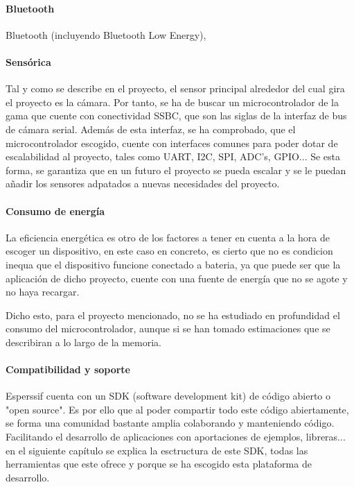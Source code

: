 \paragraph{Bluetooth}
Bluetooth (incluyendo Bluetooth Low Energy),

\paragraph{Sensórica}
Tal y como se describe en el proyecto, el sensor principal alrededor del cual gira el proyecto es la cámara. Por tanto, se ha de buscar un microcontrolador de la gama que cuente con conectividad SSBC, que son las siglas de la interfaz de bus de cámara serial. Además de esta interfaz, se ha comprobado, que el microcontrolador escogido, cuente con interfaces comunes para poder dotar de escalabilidad al proyecto, tales como UART, I2C, SPI, ADC's, GPIO... Se esta forma, se garantiza que en un futuro el proyecto se pueda escalar y se le puedan añadir los sensores adpatados a nuevas necesidades del proyecto. 

\paragraph{Consumo de energía}
La eficiencia energética es otro de los factores a tener en cuenta a la hora de escoger un dispositivo, en este caso en concreto, es cierto que no es condicion inequa que el dispositivo funcione conectado a bateria, ya que puede ser que la aplicación de dicho proyecto, cuente con una fuente de energía que no se agote y no haya recargar.

Dicho esto, para el proyecto mencionado, no se ha estudiado en profundidad el consumo del microcontrolador, aunque si se han tomado estimaciones que se describiran a lo largo de la memoria.

\paragraph{Compatibilidad y soporte}
Esperssif cuenta con un SDK (software development kit) de código abierto o "open source". Es por ello que al poder compartir todo este código abiertamente, se forma una comunidad bastante amplia colaborando y manteniendo código. Facilitando el desarrollo de aplicaciones con aportaciones de ejemplos, libreras... en el siguiente capítulo se explica la esctructura de este SDK, todas las herramientas que este ofrece y porque se ha escogido esta plataforma de desarrollo.

